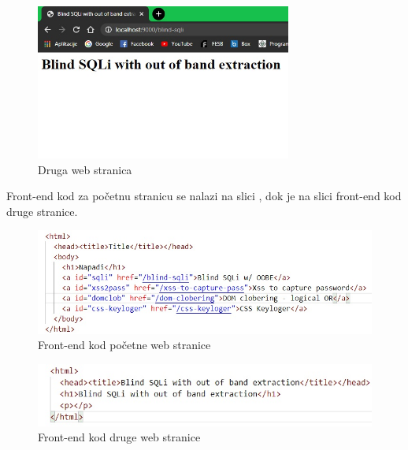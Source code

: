 \documentclass[12pt, oneside, onecolumn]{book}
\begin{document}
{\begin{figure}[H]
	\begin{center}
		\includegraphics[width=0.75\textwidth]{bsqli_snd.jpg}
		\caption{Druga web stranica} \label{fig:bsqli_snd}
	\end{center}
\end{figure}

Front-end kod za početnu stranicu se nalazi na slici , dok je na slici front-end kod druge stranice.

\begin{figure}[H]
	\begin{center}
		\includegraphics[width=\textwidth]{bsqli_main_f.jpg}
		\caption{Front-end kod početne web stranice} \label{fig:bsqli_main_f}
	\end{center}
\end{figure}

\begin{figure}[H]
	\begin{center}
		\includegraphics[width=\textwidth]{bsqli_snd_f.jpg}
		\caption{Front-end kod druge web stranice} \label{fig:bsqli_snd_f}
	\end{center}
\end{figure}

}
\end{document}
